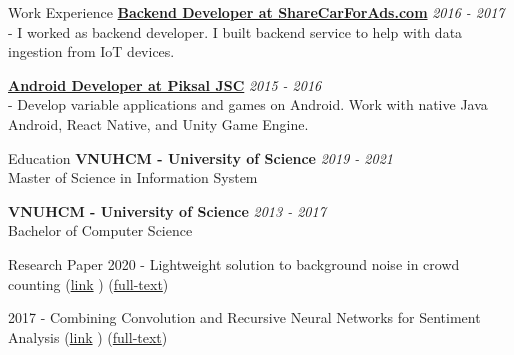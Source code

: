 \documentclass{resume} %
\begin{document}
\begin{rSection}{Work Experience}
{\bf \underline{Backend Developer at ShareCarForAds.com}} \hfill {\em 2016 - 2017}\\
- I worked as backend developer. I built backend service to help with data ingestion from IoT devices. 

{\bf \underline{Android Developer at Piksal JSC}} \hfill {\em 2015 - 2016}\\
- Develop variable applications and games on Android. Work with native Java Android, React Native, and Unity Game Engine. 

\end{rSection}

\begin{rSection}{Education}
{\bf VNUHCM - University of Science} \hfill {\em 2019 - 2021 } 
\\ Master of Science in Information System  %

{\bf VNUHCM - University of Science} \hfill {\em 2013 - 2017 } 
\\ Bachelor of Computer Science  %
\end{rSection}
\begin{rSection}{Research Paper}
2020 - Lightweight solution to background noise in crowd counting 
(\href{https://ieeexplore.ieee.org/document/9335834}{link}  )
(\href{https://github.com/ttpro1995/NICS2020_paper/releases/tag/v1}{full-text})

2017 - Combining Convolution and Recursive Neural Networks for Sentiment Analysis (\href{https://dl.acm.org/doi/abs/10.1145/3155133.3155158}{link}  )
(\href{https://github.com/ttpro1995/soICT2017/releases/tag/v1.1}{full-text})
\end{rSection}
\end{document}

